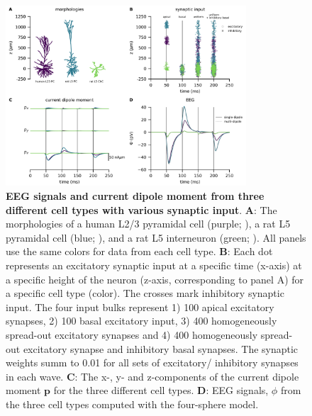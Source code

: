 \documentclass[preprint,10pt,authoryear]{elsarticle}
\newcommand{\hlb}[2][NavyBlue]{ {\sethlcolor{#1} \hl{#2}} }
\newcommand{\hlg}[2][Emerald]{ {\sethlcolor{#1} \hl{#2}} }
\newcommand{\snnote}[1]{\color{white}{\hlb{SN: #1 }}\color{black}}
\newcommand{\tvnnote}[1]{\color{white}{\hlg{TVN: #1 }}\color{black}}
\begin{document}


\begin{figure}[H]
	\centering
	\includegraphics[width=0.8\textwidth]{figure3.png}
	\caption{\textbf{EEG signals and current dipole moment from three different cell types with various synaptic input}.
	\textbf{A}: The morphologies of a human L2/3 pyramidal cell (purple; \cite{EYAL2016}), a rat L5 pyramidal cell (blue; \cite{HAY2011}), and a rat L5 interneuron (green; \cite{MARKRAM2015}). All panels use the same colors for data from each cell type.
	\textbf{B}: Each dot represents an excitatory synaptic input at a specific time (x-axis) at a specific height of the neuron (z-axis, corresponding to panel A) for a specific cell type (color). The crosses mark inhibitory synaptic input. The four input bulks represent 1) 100 apical excitatory synapses, 2) 100 basal excitatory input, 3) 400 homogeneously spread-out excitatory synapses and 4) 400 homogeneously spread-out excitatory synapse and inhibitory basal synapses. The synaptic weights summ to 0.01 for all sets of excitatory/ inhibitory synapses in each wave.
	\textbf{C}: The x-, y- and z-components of the current dipole moment $\mathbf{p}$ for the three different cell types.
	\textbf{D}: EEG signals, $\phi$ from the three cell types computed with the four-sphere model.
	}
	\label{fig:eeg_compare_cell_types}
\end{figure}
\end{document}
